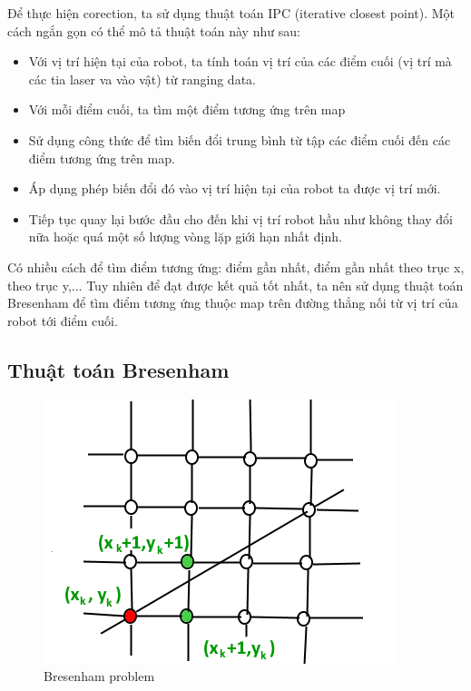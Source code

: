 \documentclass[../../main.tex]{subfiles}
\begin{document}
Để thực hiện corection, ta sử dụng thuật toán IPC (iterative closest point). Một cách ngắn gọn có thể mô tả thuật toán này như sau:
\begin{itemize}
    \item Với vị trí hiện tại của robot, ta tính toán vị trí của các điểm cuối (vị trí mà các tia laser va vào vật) từ ranging data.
    \item Với mỗi điểm cuối, ta tìm một điểm tương ứng trên map
    \item Sử dụng công thức để tìm biến đổi trung bình từ tập các điểm cuối đến các điểm tương ứng trên map.
    \item Áp dụng phép biến đổi đó vào vị trí hiện tại của robot ta được vị trí mới.
    \item Tiếp tục quay lại bước đầu cho đến khi vị trí robot hầu như không thay đổi nữa hoặc quá một số lượng vòng lặp giới hạn nhất định.
\end{itemize}

Có nhiều cách để tìm điểm tương ứng: điểm gần nhất, điểm gần nhất theo trục x, theo trục y,... Tuy nhiên để đạt được kết quả tốt nhất, ta nên sử dụng thuật toán Bresenham để tìm điểm tương ứng thuộc map trên đường thẳng nối từ vị trí của robot tới điểm cuối.

\subsection*{Thuật toán Bresenham}
\begin{figure}[H]
    \begin{center}
        \includegraphics[scale=0.8]{BresenhamLine.png}
    \end{center}
    \caption{Bresenham problem}
    \label{fig:bresenham_problem}
\end{figure}
\end{document}
